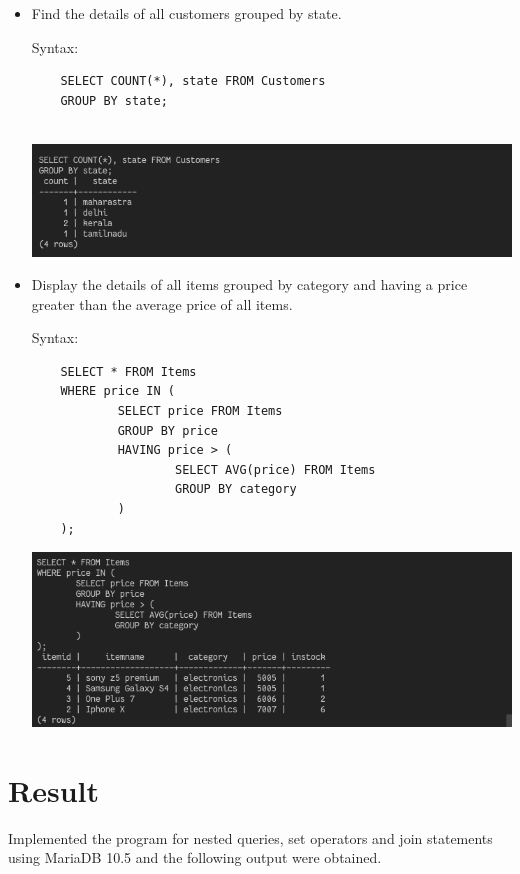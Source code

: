 \documentclass[13pt,oneside]{book}
\begin{document}
\begin{itemize}
	
	\item
	Find the details of all customers grouped by state.
	 
	Syntax:
	\begin{verbatim}
	SELECT COUNT(*), state FROM Customers 
	GROUP BY state;
	
	\end{verbatim}
	\includegraphics[width=\textwidth]{img/p7/ss14.png}
	
	
	\item
	Display the details of all items grouped by category and having a price greater than
	 the average price of all items.
	
	Syntax:
	\begin{verbatim}
	SELECT * FROM Items
	WHERE price IN (
			SELECT price FROM Items
			GROUP BY price
			HAVING price > (
					SELECT AVG(price) FROM Items
					GROUP BY category
			)
	);
	\end{verbatim}
	\includegraphics[width=\textwidth]{img/p7/ss15.png}
	
\end{itemize}
\section*{Result}
Implemented the program for nested queries, set operators and join statements using MariaDB 10.5 and the following output
were obtained.
\end{document}
